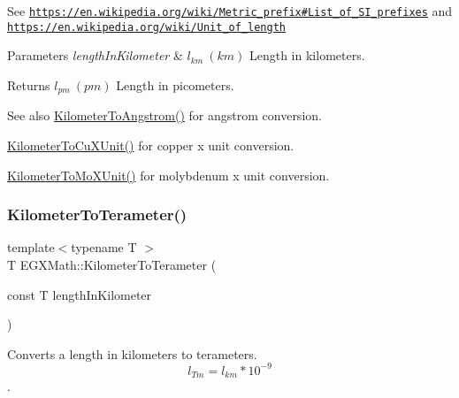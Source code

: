 See \href{https://en.wikipedia.org/wiki/Metric_prefix#List_of_SI_prefixes}{\tt https\+://en.\+wikipedia.\+org/wiki/\+Metric\+\_\+prefix\#\+List\+\_\+of\+\_\+\+S\+I\+\_\+prefixes} and \href{https://en.wikipedia.org/wiki/Unit_of_length}{\tt https\+://en.\+wikipedia.\+org/wiki/\+Unit\+\_\+of\+\_\+length} 
\begin{DoxyParams}{Parameters}
{\em length\+In\+Kilometer} & $ l_{km}\ (km)$ Length in kilometers. \\
\hline
\end{DoxyParams}
\begin{DoxyReturn}{Returns}
$ l_{pm}\ (pm)$ Length in picometers. 
\end{DoxyReturn}
\begin{DoxySeeAlso}{See also}
\mbox{\hyperlink{group___e_g_x_math-_conversions-_length_conversions-_s_i-_kilometer-_non-_s_i_ga415a412a1b03916d6071a206a3318035}{Kilometer\+To\+Angstrom()}} for angstrom conversion. 

\mbox{\hyperlink{group___e_g_x_math-_conversions-_length_conversions-_s_i-_kilometer-_non-_s_i_ga0614eb6a9e8bf1a9ba6cf51121f22083}{Kilometer\+To\+Cu\+X\+Unit()}} for copper x unit conversion. 

\mbox{\hyperlink{group___e_g_x_math-_conversions-_length_conversions-_s_i-_kilometer-_non-_s_i_ga547782594ebd0cc3e565f6d32f9528df}{Kilometer\+To\+Mo\+X\+Unit()}} for molybdenum x unit conversion. 
\end{DoxySeeAlso}
\mbox{\label{group___e_g_x_math-_conversions-_length_conversions-_s_i-_kilometer-_s_i_gadc147bd94e976f0577e7ca544ed81bf9}} 
\subsubsection{\texorpdfstring{Kilometer\+To\+Terameter()}{KilometerToTerameter()}}
{\footnotesize\ttfamily template$<$typename T $>$ \\
T E\+G\+X\+Math\+::\+Kilometer\+To\+Terameter (\begin{DoxyParamCaption}\item[{const T}]{length\+In\+Kilometer }\end{DoxyParamCaption})}



Converts a length in kilometers to terameters. \[ l_{Tm}=l_{km} * 10^{-9} \]. 

